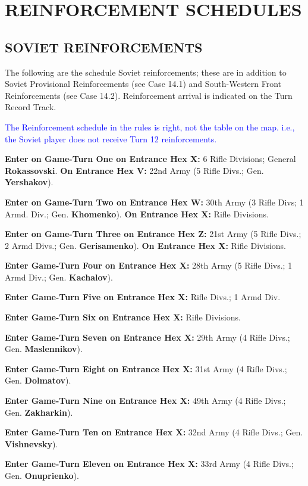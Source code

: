 \section{REINFORCEMENT SCHEDULES}

\subsection{SOVIET REINFORCEMENTS}

The following are the schedule Soviet reinforcements; these are in addition to Soviet Provisional Reinforcements (see Case 14.1) and South-Western Front Reinforcements (see Case 14.2). Reinforcement arrival is indicated on the Turn Record Track.

\textcolor{blue}{The Reinforcement schedule in the rules is right, not the table on the map. i.e., the Soviet player does not receive Turn 12 reinforcements.}

\begin{flushleft}
  \textbf{Enter on Game-Turn One on Entrance Hex X:}
  6 Rifle Divisions; General \textbf{Rokassovski}.
  \break
  \textbf{On Entrance Hex V:}
  \break
  22nd Army (5 Rifle Divs.; Gen. \textbf{Yershakov}).

  \textbf{Enter on Game-Turn Two on Entrance Hex W:}
  30th Army (3 Rifle Divs; 1 Armd. Div.; Gen. \textbf{Khomenko}).
  \break
  \textbf{On Entrance Hex X:}
   Rifle Divisions.

  \textbf{Enter on Game-Turn Three on Entrance Hex Z:}
  21st Army (5 Rifle Divs.; 2 Armd Divs.; Gen. \textbf{Gerisamenko}).
  \break
  \textbf{On Entrance Hex X:}
   Rifle Divisions.

  \textbf{Enter Game-Turn Four on Entrance Hex X:}
  28th Army (5 Rifle Divs.; 1 Armd Div.; Gen. \textbf{Kachalov}).

  \textbf{Enter Game-Turn Five on Entrance Hex X:}
   Rifle Divs.; 1 Armd Div.

  \textbf{Enter Game-Turn Six on Entrance Hex X:}
   Rifle Divisions.

  \textbf{Enter Game-Turn Seven on Entrance Hex X:}
  \break
  29th Army (4 Rifle Divs.; Gen. \textbf{Maslennikov}).

  \textbf{Enter Game-Turn Eight on Entrance Hex X:}
  \break
  31st Army (4 Rifle Divs.; Gen. \textbf{Dolmatov}).

  \textbf{Enter Game-Turn Nine on Entrance Hex X:}
  \break
  49th Army (4 Rifle Divs.; Gen. \textbf{Zakharkin}).

  \textbf{Enter Game-Turn Ten on Entrance Hex X:}
  \break
  32nd Army (4 Rifle Divs.; Gen. \textbf{Vishnevsky}).

  \textbf{Enter Game-Turn Eleven on Entrance Hex X:}
  \break
  33rd Army (4 Rifle Divs.; Gen. \textbf{Onuprienko}).
\end{flushleft}

